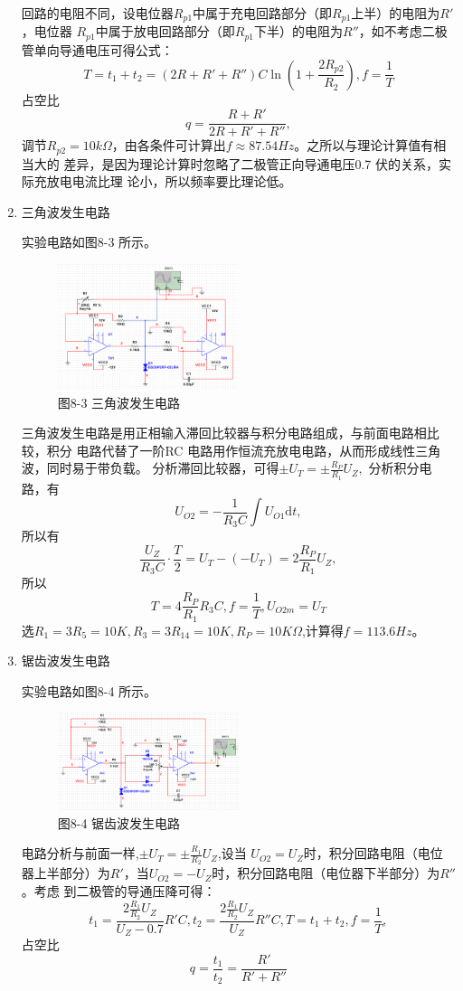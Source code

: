 \documentclass[a4paper,10pt,notitlepage]{article}
\begin{document}
\begin{enumerate}
		回路的电阻不同，设电位器$R_{p1}$中属于充电回路部分（即$R_{p1}$上半）的电阻为${R}'$，电位器
		$R_{p1}$中属于放电回路部分（即$R_{p1}$下半）的电阻为${R}''$，如不考虑二极管单向导通电压可得公式：
		$$T=t_1+t_2=(2R+{R}'+{R}'')C\ln{(1+\frac{2R_{p2}}{R_2})},f=\frac{1}{T}$$
		占空比$$q=\frac{R+{R}'}{2R+{R}'+{R}''},$$
		调节$R_{p2}=10k\Omega$，由各条件可计算出$f\approx 87.54Hz$。之所以与理论计算值有相当大的
		差异，是因为理论计算时忽略了二极管正向导通电压0.7 伏的关系，实际充放电电流比理
		论小，所以频率要比理论低。
		\item 三角波发生电路\par 
		实验电路如图8-3 所示。\par 
		\begin{figure}[h]
			\centering
			\includegraphics[width=0.5\textwidth]{3.png}
			\caption*{图8-3 三角波发生电路}
		\end{figure}
		\qquad 三角波发生电路是用正相输入滞回比较器与积分电路组成，与前面电路相比较，积分
		电路代替了一阶RC 电路用作恒流充放电电路，从而形成线性三角波，同时易于带负载。
		分析滞回比较器，可得$\pm U_T=\pm \frac{R_P}{R_1}U_Z,$
		分析积分电路，有$$U_{O2}=-\frac{1}{R_3C}\int U_{O1}\mathrm{d}t,$$
		所以有$$\frac{U_Z}{R_3C}\cdot \frac{T}{2}=U_T-(-U_T)=2\frac{R_P}{R_1}U_Z,$$
		所以$$T=4\frac{R_P}{R_1}R_3C,f=\frac{1}{T},U_{O2m}=U_T$$
		选$R_1=3R_5=10K,R_3=3R_{14}=10K,R_P=10K\Omega$,计算得$f=113.6Hz$。
		\item 锯齿波发生电路\par 
		实验电路如图8-4 所示。\par
		\begin{figure}[h]
			\centering
			\includegraphics[width=0.5\textwidth]{4.png}
			\caption*{图8-4 锯齿波发生电路}
		\end{figure}
		\qquad 电路分析与前面一样,$\pm U_T=\pm \frac{R_1}{R_2}U_Z$,设当
		$U_{O2}=U_Z$时，积分回路电阻（电位
		器上半部分）为${R}'$，当$U_{O2}=-U_Z$时，积分回路电阻（电位器下半部分）为${R}''$。考虑
		到二极管的导通压降可得：
		$$t_1=\frac{2\frac{R_1}{R_2}U_Z}{U_Z-0.7}{R}'C,t_2=\frac{2\frac{R_1}{R_2}U_Z}{U_Z}{R}''C,T=t_1+t_2,f=\frac{1}{T},$$
		占空比$$q=\frac{t_1}{t_2}=\frac{{R}'}{{R}'+{R}''}$$
	\end{enumerate}
\end{document}
